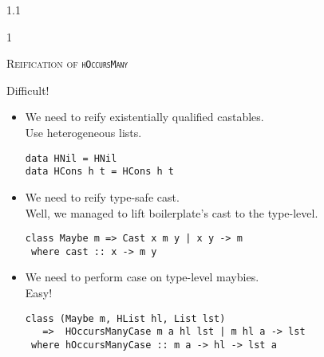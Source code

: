 \documentclass{slides}
\newcommand{\littleskip}{\topsep6pt \parskip6pt \partopsep6pt}
\newcommand{\header}[1]{{\large\scshape \color{Red} #1} \medskip }
\newcommand{\blau}[1]{{\color{Blue} #1} \medskip }
\newenvironment{myslide}{\begin{slide}\color{Blue}\begin{boxedminipage}{1.1\hsize}\begin{boxedminipage}{1\hsize}\color{Black}
\vspace{-170\in}
}{%
\smallskip
\end{boxedminipage}
\end{boxedminipage}
\end{slide}}
\begin{document}



\begin{myslide}

\header{Reification of {\textrm{\texttt{hOccursMany}}}}

\blau{Difficult!}

\vspace{-42\in}

{\small

\littleskip\begin{itemize}
%
\item We need to reify existentially qualified castables.\\
Use heterogeneous lists.
%
\begin{Verbatim}[fontseries=normal,fontsize=\tiny,commandchars=\\\{\}]
data HNil = HNil
data HCons h t = HCons h t
\end{Verbatim}
%
\item We need to reify type-safe cast.\\
Well, we managed to lift boilerplate's cast to the type-level.
%
\begin{Verbatim}[fontseries=normal,fontsize=\tiny,commandchars=\\\{\}]
class Maybe m => Cast x m y | x y -> m
 where cast :: x -> m y
\end{Verbatim}
%
\item We need to perform case on type-level maybies.\\
Easy!
%
\begin{Verbatim}[fontseries=normal,fontsize=\tiny,commandchars=\\\{\}]
class (Maybe m, HList hl, List lst)
   =>  HOccursManyCase m a hl lst | m hl a -> lst
 where hOccursManyCase :: m a -> hl -> lst a
\end{Verbatim}
%
\end{itemize}

}

\end{myslide}



\end{document}
